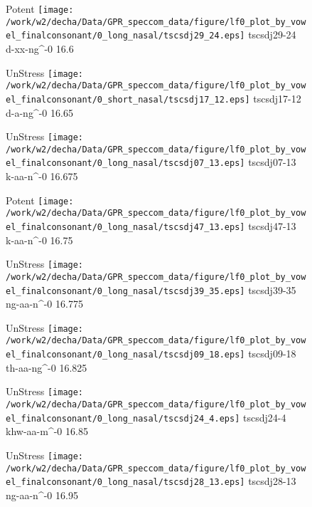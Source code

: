 \documentclass{article}
\begin{document}
\begin{figure}[t]
\begin{minipage}[b]{.24\textwidth}
\colorbox{Apricot}{Potent}
\centering
\texttt{[image: /work/w2/decha/Data/GPR\_speccom\_data/figure/lf0\_plot\_by\_vowel\_finalconsonant/0\_long\_nasal/tscsdj29\_24.eps]}
tscsdj29-24 d-xx-ng\textasciicircum-0 16.6
\end{minipage}
\begin{minipage}[b]{.24\textwidth}
UnStress
\centering
\texttt{[image: /work/w2/decha/Data/GPR\_speccom\_data/figure/lf0\_plot\_by\_vowel\_finalconsonant/0\_short\_nasal/tscsdj17\_12.eps]}
tscsdj17-12 d-a-ng\textasciicircum-0 16.65
\end{minipage}
\begin{minipage}[b]{.24\textwidth}
UnStress
\centering
\texttt{[image: /work/w2/decha/Data/GPR\_speccom\_data/figure/lf0\_plot\_by\_vowel\_finalconsonant/0\_long\_nasal/tscsdj07\_13.eps]}
tscsdj07-13 k-aa-n\textasciicircum-0 16.675
\end{minipage}
\begin{minipage}[b]{.24\textwidth}
\colorbox{Apricot}{Potent}
\centering
\texttt{[image: /work/w2/decha/Data/GPR\_speccom\_data/figure/lf0\_plot\_by\_vowel\_finalconsonant/0\_long\_nasal/tscsdj47\_13.eps]}
tscsdj47-13 k-aa-n\textasciicircum-0 16.75
\end{minipage}
\end{figure}

\begin{figure}[t]
\begin{minipage}[b]{.24\textwidth}
UnStress
\centering
\texttt{[image: /work/w2/decha/Data/GPR\_speccom\_data/figure/lf0\_plot\_by\_vowel\_finalconsonant/0\_long\_nasal/tscsdj39\_35.eps]}
tscsdj39-35 ng-aa-n\textasciicircum-0 16.775
\end{minipage}
\begin{minipage}[b]{.24\textwidth}
UnStress
\centering
\texttt{[image: /work/w2/decha/Data/GPR\_speccom\_data/figure/lf0\_plot\_by\_vowel\_finalconsonant/0\_long\_nasal/tscsdj09\_18.eps]}
tscsdj09-18 th-aa-ng\textasciicircum-0 16.825
\end{minipage}
\begin{minipage}[b]{.24\textwidth}
UnStress
\centering
\texttt{[image: /work/w2/decha/Data/GPR\_speccom\_data/figure/lf0\_plot\_by\_vowel\_finalconsonant/0\_long\_nasal/tscsdj24\_4.eps]}
tscsdj24-4 khw-aa-m\textasciicircum-0 16.85
\end{minipage}
\begin{minipage}[b]{.24\textwidth}
UnStress
\centering
\texttt{[image: /work/w2/decha/Data/GPR\_speccom\_data/figure/lf0\_plot\_by\_vowel\_finalconsonant/0\_long\_nasal/tscsdj28\_13.eps]}
tscsdj28-13 ng-aa-n\textasciicircum-0 16.95
\end{minipage}
\end{figure}
\end{document}
